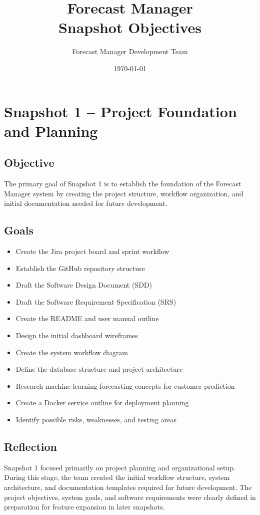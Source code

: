 \documentclass[12pt]{article}
\title{Forecast Manager\\Snapshot Objectives}
\author{Forecast Manager Development Team}
\date{\today}
\begin{document}
\maketitle
\tableofcontents
\newpage

\section{Snapshot 1 -- Project Foundation and Planning}

\subsection{Objective}
The primary goal of Snapshot 1 is to establish the foundation of the Forecast Manager system by creating the project structure, workflow organization, and initial documentation needed for future development.

\subsection{Goals}
\begin{itemize}
\item Create the Jira project board and sprint workflow
\item Establish the GitHub repository structure
\item Draft the Software Design Document (SDD)
\item Draft the Software Requirement Specification (SRS)
\item Create the README and user manual outline
\item Design the initial dashboard wireframes
\item Create the system workflow diagram
\item Define the database structure and project architecture
\item Research machine learning forecasting concepts for customer prediction
\item Create a Docker service outline for deployment planning
\item Identify possible risks, weaknesses, and testing areas
\end{itemize}

\subsection{Reflection}
Snapshot 1 focused primarily on project planning and organizational setup. During this stage, the team created the initial workflow structure, system architecture, and documentation templates required for future development. The project objectives, system goals, and software requirements were clearly defined in preparation for feature expansion in later snapshots.
\end{document}
